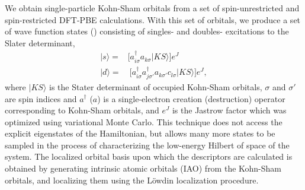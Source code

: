 We obtain single-particle Kohn-Sham orbitals from a set of spin-unrestricted and spin-restricted DFT-PBE calculations. With this set of orbitals, we produce a set of wave function states () consisting of singles- and doubles- excitations to the Slater determinant, %
\begin{subequations}
\begin{eqnarray}
| s \rangle = & \Big[a^\dagger_{i \sigma} a_{k \sigma}   | KS \rangle \Big]e^J \\
| d \rangle = & \: \Big[a^\dagger_{i \sigma} a^\dagger_{j \sigma'} a_{k \sigma'} c_{l \sigma}   | KS \rangle\Big]e^J ,
\end{eqnarray}
\end{subequations}
where $|KS\rangle$ is the Stater determinant of occupied Kohn-Sham orbitals, $\sigma$ and $\sigma'$ are spin indices and $a^\dagger$ ($a$) is a single-electron creation (destruction) operator corresponding to Kohn-Sham orbitals, and $e^J$ is the Jastrow factor which was optimized using variational Monte Carlo. This technique does not access the explicit eigenstates of the Hamiltonian, but allows many more states to be sampled in the process of characterizing the low-energy Hilbert of space of the system. The localized orbital basis upon which the descriptors are calculated is obtained by generating intrinsic atomic orbitals (IAO) from the Kohn-Sham orbitals, and localizing them using the L\"owdin localization procedure. 

